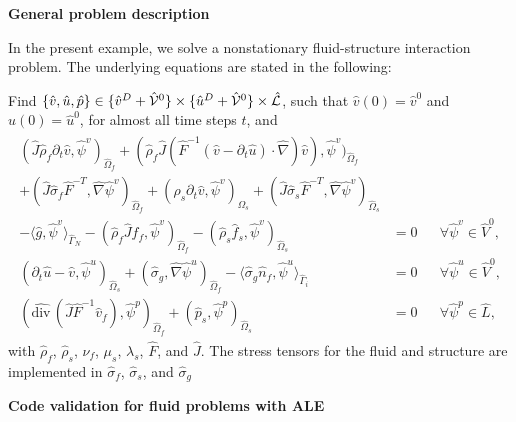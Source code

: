 \textbf{General problem description}

In the present example, we solve a 
nonstationary fluid-structure interaction problem. 
The underlying equations are stated in the following:
\begin{Problem}
  \label{eq:fsi:ale:harmonic}
  Find $\{\hat v,\hat u,\hat p\} \in \{ \hat v^D + \hat {\cal V}^0\} 
\times \{ \hat u^D + \hat {\cal V}^0 \}\times \hat {\cal L}$, 
  such that $\hat v (0) = \hat v^0$ and $\hat u(0) = \hat u^0$, for almost all
  time steps $t$, and
  \begin{eqnarray*}
    \begin{aligned}
      (\hat J\hat\rho_f  \partial_t \hat v,\hat\psi^v)_{\hat\Omega_f}  
      +(\hat\rho_f \hat J  (\hat F^{-1}(\hat
      v-\partial_t \hat u)\cdot\hat\nabla) \hat v),
      \hat\psi^v)_{\hat\Omega_f} &\\
      + (\hat J\hat\sigma_f\hat
      F^{-T},\hat\nabla\hat\psi^v)_{\hat\Omega_f}
      + (\hat\rho_s \partial_t \hat v,\hat\psi^v)_{\Omega_s}  
      + (\hat J\hat\sigma_s\hat F^{-T},\hat\nabla\hat\psi^v)_{\hat\Omega_s}&\\
      - \langle \hat g, \hat\psi^v \rangle_{\hat\Gamma_N} -
      (\hat\rho_f \hat J\hat f_f, \hat\psi^v)_{\hat\Omega_f}
      - (\hat\rho_s\hat f_s, \hat\psi^v)_{\hat\Omega_s}
      &=0&&\forall\hat\psi^v\in \hat V^0,
      \\
      (\partial_t\hat u-\hat v,\hat\psi^u)_{\hat\Omega_s} 
      + 
      (\hat\sigma_g ,\hat \nabla\hat\psi^u)_{\hat\Omega_f}
      -\langle \hat\sigma_g \hat n_f ,\hat\psi^u\rangle_{\hat \Gamma_i}
      &=0&&\forall\hat\psi^u\in \hat V^0,\\
      (\widehat{\text{div}}\,(\hat J\hat F^{-1}
      \hat v_f),\hat\psi^p)_{\hat\Omega_f} 
      + (\hat p_s ,\hat \psi^p)_{\hat\Omega_s}
      &=0&&\forall\hat\psi^p\in \hat L,
    \end{aligned}
  \end{eqnarray*}  
  with $\hat\rho_f$, $\hat\rho_s$, $\nu_f$, $\mu_s$, $\lambda_s$, $\hat F$, and $\hat J$. 
  The stress tensors for the fluid and structure are
implemented in  
  $\hat\sigma_f$, $\hat\sigma_s$, and $\hat\sigma_g$ 
\end{Problem}







{\bf Code validation for fluid problems with ALE}

